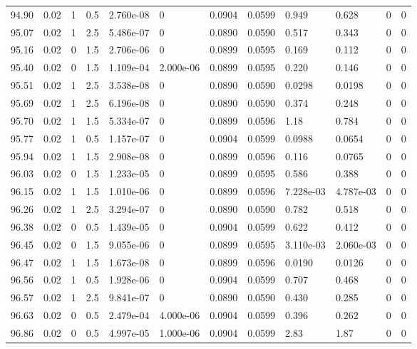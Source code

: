 \documentclass[preview]{standalone}
\begin{document}
{{{{{{{{{{{{{{{{{{{\begin{tabular}{L{1.2cm}C{1.2cm} C{0.3cm}C{0.5cm} C{1.4cm}C{1.4cm} C{1.4cm}C{1.4cm} C{1.6cm}C{1.6cm} C{1.6cm}C{1.6cm}}
  94.90  &  0.02  & 1     & 0.5 &  2.760e-08  & 0  &  0.0904&   0.0599& 0.949 & 0.628   &  0 & 0  \\ 
  95.07  &  0.02  & 1     & 2.5 &  5.486e-07  & 0  &  0.0890&   0.0590& 0.517 & 0.343   &  0 & 0  \\ 
  95.16  &  0.02  & 0     & 1.5 &  2.706e-06  & 0  &  0.0899&   0.0595& 0.169 & 0.112   &  0 & 0  \\ 
  95.40  &  0.02  & 0     & 1.5 &  1.109e-04  & 2.000e-06  &  0.0899&   0.0595& 0.220 & 0.146   &  0 & 0  \\ 
  95.51  &  0.02  & 1     & 2.5 &  3.538e-08  & 0  &  0.0890&   0.0590& 0.0298 & 0.0198   &  0 & 0  \\ 
  95.69  &  0.02  & 1     & 2.5 &  6.196e-08  & 0  &  0.0890&   0.0590& 0.374 & 0.248   &  0 & 0  \\ 
  95.70  &  0.02  & 1     & 1.5 &  5.334e-07  & 0  &  0.0899&   0.0596& 1.18 & 0.784   &  0 & 0  \\ 
  95.77  &  0.02  & 1     & 0.5 &  1.157e-07  & 0  &  0.0904&   0.0599& 0.0988 & 0.0654   &  0 & 0  \\ 
  95.94  &  0.02  & 1     & 1.5 &  2.908e-08  & 0  &  0.0899&   0.0596& 0.116 & 0.0765   &  0 & 0  \\ 
  96.03  &  0.02  & 0     & 1.5 &  1.233e-05  & 0  &  0.0899&   0.0595& 0.586 & 0.388   &  0 & 0  \\ 
  96.15  &  0.02  & 1     & 1.5 &  1.010e-06  & 0  &  0.0899&   0.0596& 7.228e-03 & 4.787e-03   &  0 & 0  \\ 
  96.26  &  0.02  & 1     & 2.5 &  3.294e-07  & 0  &  0.0890&   0.0590& 0.782 & 0.518   &  0 & 0  \\ 
  96.38  &  0.02  & 0     & 0.5 &  1.439e-05  & 0  &  0.0904&   0.0599& 0.622 & 0.412   &  0 & 0  \\ 
  96.45  &  0.02  & 0     & 1.5 &  9.055e-06  & 0  &  0.0899&   0.0595& 3.110e-03 & 2.060e-03   &  0 & 0  \\ 
  96.47  &  0.02  & 1     & 1.5 &  1.673e-08  & 0  &  0.0899&   0.0596& 0.0190 & 0.0126   &  0 & 0  \\ 
  96.56  &  0.02  & 1     & 0.5 &  1.928e-06  & 0  &  0.0904&   0.0599& 0.707 & 0.468   &  0 & 0  \\ 
  96.57  &  0.02  & 1     & 2.5 &  9.841e-07  & 0  &  0.0890&   0.0590& 0.430 & 0.285   &  0 & 0  \\ 
  96.63  &  0.02  & 0     & 0.5 &  2.479e-04  & 4.000e-06  &  0.0904&   0.0599& 0.396 & 0.262   &  0 & 0  \\ 
  96.86  &  0.02  & 0     & 0.5 &  4.997e-05  & 1.000e-06  &  0.0904&   0.0599& 2.83 & 1.87   &  0 & 0  \\ 

\end{tabular}}}}}}}}}}}}}}}}}}}}
\end{document}
